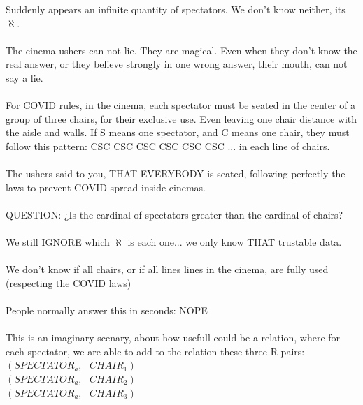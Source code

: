 		\noindent
		Suddenly appears an infinite quantity of spectators. We don't know neither, its $\aleph$.
		\\\\
		
		\noindent
		The cinema ushers can not lie. They are magical. Even when they don't know the real answer, or they believe strongly in one wrong answer, their mouth, can not say a lie.	
		\\\\
		
		\noindent
		For COVID rules, in the cinema, each spectator must be seated in the center of a group of three chairs, for their exclusive use. Even leaving one chair distance with the aisle and walls. If S means one spectator, and C means one chair, they must follow this pattern: CSC CSC CSC CSC CSC CSC ... in each line of chairs.
		\\\\
		
		\noindent
		The ushers said to you, THAT EVERYBODY is seated, following perfectly the laws to prevent COVID spread inside cinemas.
		\\\\
		
		\noindent
		QUESTION: ¿Is the cardinal of spectators greater than the cardinal of chairs?
		\\\\
		
		\noindent
		We still IGNORE which $\aleph$ is each one... we only know THAT trustable data.
		\\\\
		
		\noindent
		We don't know if all chairs, or if all lines lines in the cinema, are fully used (respecting the COVID laws)
		\\\\
		
		\noindent
		People normally answer this in seconds: NOPE
		\\\\
		
		\noindent
		This is an imaginary scenary, about how usefull could be a relation, where for each spectator, we are able to add to the relation these three R-pairs:\\
		$(SPECTATOR_{a}, \:\:\: CHAIR_{1})$\\
		$(SPECTATOR_{a}, \:\:\: CHAIR_{2})$\\
		$(SPECTATOR_{a}, \:\:\: CHAIR_{3})$\\
		\\\\
		
